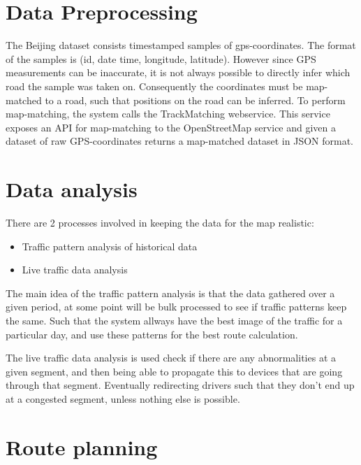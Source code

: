 \section{Data Preprocessing}
The Beijing dataset consists timestamped samples of gps-coordinates. The format of the samples is (id, date time, longitude, latitude). However since GPS measurements can be inaccurate, it is not always possible to directly infer which road the sample was taken on. Consequently the coordinates must be map-matched to a road, such that positions on the road can be inferred. To perform map-matching, the system calls the TrackMatching webservice\cite{TrackMatching}. This service exposes an API for map-matching to the OpenStreetMap service and given a dataset of raw GPS-coordinates returns a map-matched dataset in JSON format. 
\section{Data analysis}
There are 2 processes involved in keeping the data for the map realistic:
\begin{itemize}
	\item Traffic pattern analysis of historical data
	\item Live traffic data analysis
\end{itemize}

The main idea of the traffic pattern analysis is that the data gathered over a given period, at some point will be bulk processed to see if traffic patterns keep the same. Such that the system allways have the best image of the traffic for a particular day, and use these patterns for the best route calculation.

The live traffic data analysis is used check if there are any abnormalities at a given segment, and then being able to propagate this to devices that are going through that segment. Eventually redirecting drivers such that they don't end up at a congested segment, unless nothing else is possible.
\section{Route planning}
